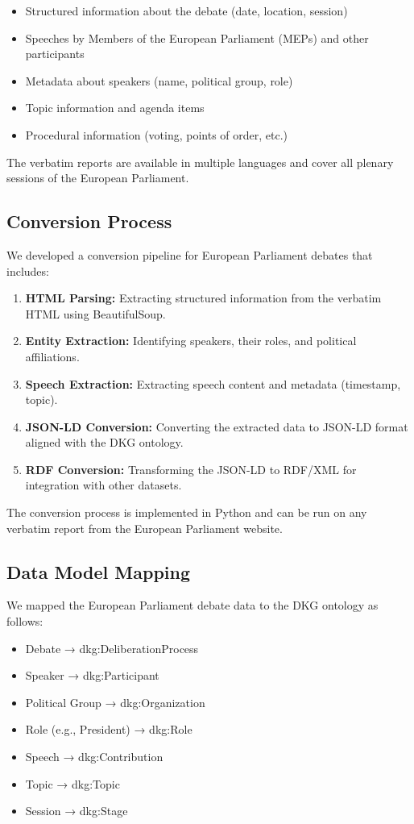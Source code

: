 \documentclass[runningheads]{llncs}  %
\begin{document}
\begin{itemize}
    \item Structured information about the debate (date, location, session)
    \item Speeches by Members of the European Parliament (MEPs) and other participants
    \item Metadata about speakers (name, political group, role)
    \item Topic information and agenda items
    \item Procedural information (voting, points of order, etc.)
\end{itemize}

The verbatim reports are available in multiple languages and cover all plenary sessions of the European Parliament.

\subsection{Conversion Process}
We developed a conversion pipeline for European Parliament debates that includes:

\begin{enumerate}
    \item \textbf{HTML Parsing:} Extracting structured information from the verbatim HTML using BeautifulSoup.
    \item \textbf{Entity Extraction:} Identifying speakers, their roles, and political affiliations.
    \item \textbf{Speech Extraction:} Extracting speech content and metadata (timestamp, topic).
    \item \textbf{JSON-LD Conversion:} Converting the extracted data to JSON-LD format aligned with the DKG ontology.
    \item \textbf{RDF Conversion:} Transforming the JSON-LD to RDF/XML for integration with other datasets.
\end{enumerate}

The conversion process is implemented in Python and can be run on any verbatim report from the European Parliament website.

\subsection{Data Model Mapping}
We mapped the European Parliament debate data to the DKG ontology as follows:

\begin{itemize}
    \item Debate → dkg:DeliberationProcess
    \item Speaker → dkg:Participant
    \item Political Group → dkg:Organization
    \item Role (e.g., President) → dkg:Role
    \item Speech → dkg:Contribution
    \item Topic → dkg:Topic
    \item Session → dkg:Stage
\end{itemize}
\end{document}
